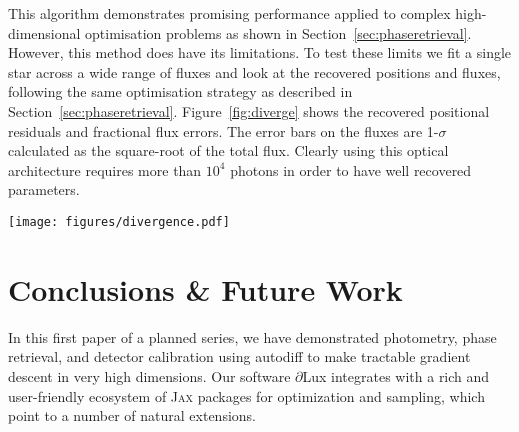\documentclass[]{spieman}
\newcommand\jax{\textsc{Jax}\xspace}
\newcommand\dlux{$\partial$Lux\xspace}
\begin{document}
This algorithm demonstrates promising performance applied to complex high-dimensional optimisation problems as shown in Section~\ref{sec:phaseretrieval}. However, this method does have its limitations. To test these limits we fit a single star across a wide range of fluxes and look at the recovered positions and fluxes, following the same optimisation strategy as described in Section~\ref{sec:phaseretrieval}. Figure~\ref{fig:diverge} shows the recovered positional residuals and fractional flux errors. The error bars on the fluxes are 1-$\sigma$ calculated as the square-root of the total flux. Clearly using this optical architecture requires more than $10^4$ photons in order to have well recovered parameters.

\begin{figure*}
    \centering
    \texttt{[image: figures/divergence.pdf]}
    \caption{Parameter recovery of a single star over varying \ac{snr}. Left: Absolute positional residuals vs total flux. Right: Fractional flux error vs total flux.}
    \label{fig:diverge}
\end{figure*}



\section{Conclusions \& Future Work}
In this first paper of a planned series, we have demonstrated photometry, phase retrieval, and detector calibration using autodiff to make tractable gradient descent in very high dimensions. Our software \dlux integrates with a rich and user-friendly ecosystem of \jax packages for optimization and sampling, which point to a number of natural extensions.
\end{document}
